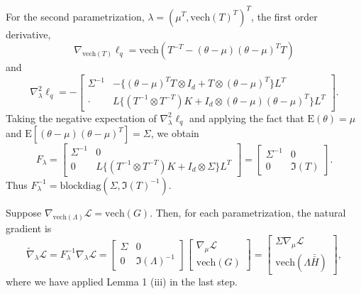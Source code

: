 \documentclass{statsoc}
\newcommand\E{{\text{E}}}
\newcommand\blockdiag{{\text{blockdiag}}}
\newcommand\mL{{\mathcal{L}}}
\newcommand{\vech}{\text{vech}}
\newcommand{\dH}{\bar{\bar{H}}}
\begin{document}
For the second parametrization, $\lambda = (\mu^T, \vech(T)^T)^T$, the first order derivative, 
\[
\nabla_{\vech(T)} \ell_q =\vech(T^{-T} - (\theta -\mu) (\theta -\mu)^T T) 
\]
and 
\[
\nabla_\lambda^2 \ell_q= -
\begin{bmatrix}
\Sigma^{-1} & - \{(\theta -\mu)^T T \otimes I_d + T \otimes (\theta -\mu)^T\}L^T \\
\cdot  &   L\{ (T^{-1} \otimes T^{-T} ) K + I_d \otimes (\theta -\mu)(\theta -\mu)^T \}L^T
\end{bmatrix}.
\]
Taking the negative expectation of $\nabla_\lambda^2 \ell_q$ and applying the fact that $\E(\theta) = \mu$ and $\E[(\theta -\mu)(\theta -\mu)^T] = \Sigma$, we obtain 
\begin{equation*} 
F_\lambda = \begin{bmatrix}
\Sigma^{-1} & 0 \\
0 & L\{ (T^{-1} \otimes T^{-T } ) K + I_d \otimes \Sigma \}L^T 
\end{bmatrix} =
\begin{bmatrix}
\Sigma^{-1} & 0 \\ 0 & \mathfrak{I}(T)
\end{bmatrix}.
\end{equation*}
Thus $F_\lambda^{-1} = \blockdiag(\Sigma, \mathfrak{I}(T)^{-1})$.

Suppose $\nabla_{\vech(\Lambda)} \mL = \vech(G)$. Then, for each parametrization, the natural gradient is 
\[
\widetilde{\nabla} _{\lambda} \mL = F_{\lambda}^{-1} \nabla_{\lambda} \mL 
= \begin{bmatrix} \Sigma & 0 \\ 0 & \mathfrak{I}(\Lambda)^{-1} \end{bmatrix}
\begin{bmatrix} \nabla_\mu \mL \\ \vech(G) \end{bmatrix} 
= \begin{bmatrix} \Sigma \nabla_\mu \mL  \\  \vech(\Lambda \dH) \end{bmatrix},
\]
where we have applied Lemma 1 (iii) in the last step.
\end{document}
